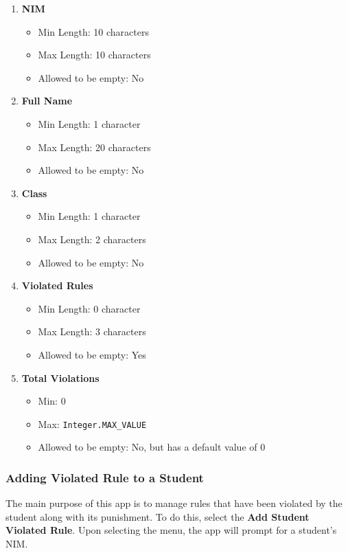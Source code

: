 \documentclass[12pt,titlepage]{article}
\begin{document}
\begin{enumerate}
    \item {
        \textbf{NIM}
        \begin{itemize}
            \item Min Length: 10 characters
            \item Max Length: 10 characters
            \item Allowed to be empty: No
        \end{itemize}
    }
    \item {
        \textbf{Full Name}
        \begin{itemize}
            \item Min Length: 1 character
            \item Max Length: 20 characters
            \item Allowed to be empty: No
        \end{itemize}
    }
    \item {
        \textbf{Class}
        \begin{itemize}
            \item Min Length: 1 character
            \item Max Length: 2 characters
            \item Allowed to be empty: No
        \end{itemize}
    }
    \item {
        \textbf{Violated Rules}
        \begin{itemize}
            \item Min Length: 0 character
            \item Max Length: 3 characters
            \item Allowed to be empty: Yes
        \end{itemize}
    }
    \item {
        \textbf{Total Violations}
        \begin{itemize}
            \item Min: 0
            \item Max: \texttt{Integer.MAX\_VALUE}
            \item Allowed to be empty: No, but has a default value of 0
        \end{itemize}
    }
\end{enumerate}

\pagebreak

\subsubsection{Adding Violated Rule to a Student}
The main purpose of this app is to manage rules that have been violated by the student along with its punishment.
To do this, select the \textbf{Add Student Violated Rule}. Upon selecting the menu, the app will prompt for a student's NIM.
\end{document}

